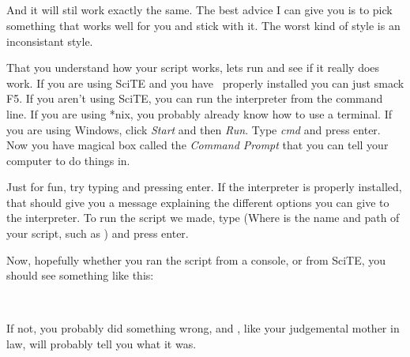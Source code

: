 \documentclass{book}
\begin{document}
\begin{SSCodeBox}
 \\
 \\
 \\
\scitea{} \\
 \\
\scitel{:} \\
 \\
\scitea{\{} \\
\scitea{;}
\scitea{\}} \\
\end{SSCodeBox}

And it will stil work exactly the same.  The best advice I can give you is to pick something that works well for you and stick with it.  The worst kind of style is an inconsistant style.

That you understand how your script works, lets run and see if it really does work.  If you are using SciTE and you have \SSquaredInterpreter\ properly installed  you can just smack F5.  If you aren't using SciTE, you can run the interpreter from the command line.  If you are using *nix, you probably already know how to use a terminal.  If you are using Windows, click \emph{Start} and then \emph{Run}.  Type \emph{cmd} and press enter.  Now you have magical box called the \emph{Command Prompt} that you can tell your computer to do things in.

Just for fun, try typing  and pressing enter.  If the interpreter is properly installed, that should give you a message explaining the different options you can give to the interpreter.  To run the script we made, type  (Where  is the name and path of your script, such as ) and press enter.

Now, hopefully whether you ran the script from a console, or from SciTE, you should see something like this:

\begin{SSCodeBox}
 \\
\end{SSCodeBox}

If not, you probably did something wrong, and \SSquaredInterpreter, like your judgemental mother in law, will probably tell you what it was. 
\end{document}
